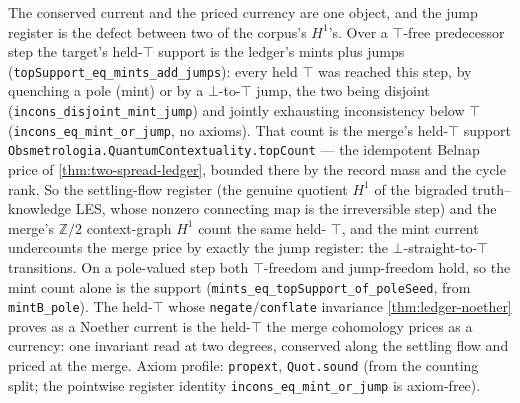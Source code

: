 \begin{theorem}\label{thm:mint-register-is-top-support}\leanok{}
The conserved current and the priced currency are one object, and the jump
register is the defect between two of the corpus's \(H^1\)'s. Over a \(\top\)-free
predecessor step the target's held-\(\top\) support is the ledger's mints plus
jumps (\texttt{topSupport\_eq\_mints\_add\_jumps}): every held \(\top\) was reached
this step, by quenching a pole (mint) or by a \(\bot\)-to-\(\top\) jump, the two
being disjoint (\texttt{incons\_disjoint\_mint\_jump}) and jointly exhausting
inconsistency below \(\top\) (\texttt{incons\_eq\_mint\_or\_jump}, no axioms). That
count is the merge's held-\(\top\) support
\texttt{Obsmetrologia.QuantumContextuality.topCount} --- the idempotent Belnap
price of \cref{thm:two-spread-ledger}, bounded there by the record mass and the
cycle rank. So the settling-flow register (the genuine quotient \(H^1\) of the
bigraded truth--knowledge LES, whose nonzero connecting map is the irreversible
step) and the merge's \(\mathbb Z/2\) context-graph \(H^1\) count the same held-
\(\top\), and the mint current undercounts the merge price by exactly the jump
register: the \(\bot\)-straight-to-\(\top\) transitions. On a pole-valued step both
\(\top\)-freedom and jump-freedom hold, so the mint count alone is the support
(\texttt{mints\_eq\_topSupport\_of\_poleSeed}, from \texttt{mintB\_pole}). The
held-\(\top\) whose \texttt{negate}/\texttt{conflate} invariance
\cref{thm:ledger-noether} proves as a Noether current is the held-\(\top\) the
merge cohomology prices as a currency: one invariant read at two degrees,
conserved along the settling flow and priced at the merge. Axiom profile:
\texttt{propext}, \texttt{Quot.sound} (from the counting split; the pointwise
register identity \texttt{incons\_eq\_mint\_or\_jump} is axiom-free).
\end{theorem}


